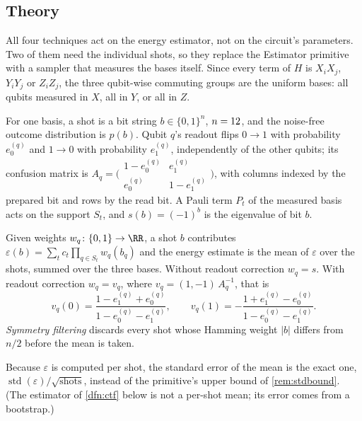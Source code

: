 \subsection{Theory}

All four techniques act on the energy estimator, not on the circuit's parameters. Two of them
need the individual shots, so they replace the Estimator primitive with a sampler that measures
the \VMeasGroups{} bases itself. Since every term of $H$ is $X_iX_j$, $Y_iY_j$ or $Z_iZ_j$, the
three qubit-wise commuting groups are the uniform bases: all qubits measured in $X$, all in $Y$,
or all in $Z$.

\begin{ntn}
  For one basis, a shot is a bit string $b\in\{0,1\}^{n}$, $n=12$, and the noise-free
  outcome distribution is $p(b)$. Qubit $q$'s readout flips $0\to1$ with probability $e_0^{(q)}$
  and $1\to0$ with probability $e_1^{(q)}$, independently of the other qubits; its confusion
  matrix is
  $A_q=\bigl(\begin{smallmatrix}1-e_0^{(q)} & e_1^{(q)}\\ e_0^{(q)} & 1-e_1^{(q)}\end{smallmatrix}\bigr)$,
  with columns indexed by the prepared bit and rows by the read bit. A Pauli term $P_t$ of the
  measured basis acts on the support $S_t$, and $s(b)=(-1)^{b}$ is the eigenvalue of bit $b$.
\end{ntn}

\begin{dfn}\label{dfn:counts}
  Given weights $w_q\colon\{0,1\}\to\RR$, a shot $b$ contributes
  $\varepsilon(b)=\sum_t c_t\prod_{q\in S_t}w_q(b_q)$ and the energy estimate is the mean of
  $\varepsilon$ over the shots, summed over the three bases. Without readout correction
  $w_q=s$. With readout correction $w_q=v_q$, where $v_q=(1,-1)\,A_q^{-1}$, that is
  \[
    v_q(0)=\frac{1-e_1^{(q)}+e_0^{(q)}}{1-e_0^{(q)}-e_1^{(q)}},\qquad
    v_q(1)=-\frac{1+e_1^{(q)}-e_0^{(q)}}{1-e_0^{(q)}-e_1^{(q)}} .
  \]
  \emph{Symmetry filtering} discards every shot whose Hamming weight $|b|$ differs from $n/2$
  before the mean is taken.
\end{dfn}

Because $\varepsilon$ is computed per shot, the standard error of the mean is the exact one,
$\operatorname{std}(\varepsilon)/\sqrt{\text{shots}}$, instead of the primitive's upper bound
of \cref{rem:stdbound}. (The estimator of \cref{dfn:ctf} below is not a per-shot mean; its
error comes from a bootstrap.)

